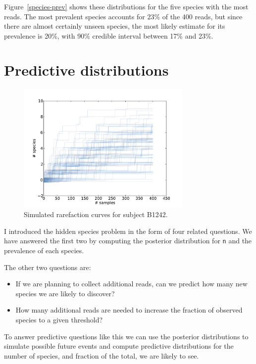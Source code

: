\documentclass[12pt]{book}
\begin{document}
Figure~\ref{species-prev} shows these distributions for the five
species with the most reads.  The most prevalent species accounts for
23\% of the 400 reads, but since there are almost certainly unseen
species, the most likely estimate for its prevalence is 20\%,
with 90\% credible interval between 17\% and 23\%.


\section{Predictive distributions}

\begin{figure}
\centerline{\includegraphics[height=2.5in]{figs/species-rare-B1242.pdf}}
\caption{Simulated rarefaction curves for subject B1242.}
\label{species-rare}
\end{figure}

I introduced the hidden species problem in the form of four related
questions.  We have answered the first two by computing the posterior
distribution for {\tt n} and the prevalence of each species.

The other two questions are:

\begin{itemize}

\item If we are planning to collect additional reads, can we predict
  how many new species we are likely to discover?

\item How many additional reads are needed to increase the
  fraction of observed species to a given threshold?

\end{itemize}

To answer predictive questions like this we can use the posterior
distributions to simulate possible future events and compute
predictive distributions for the number of species, and fraction of
the total, we are likely to see.
\end{document}
